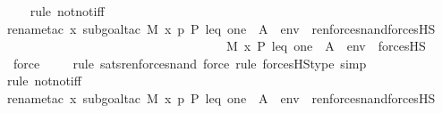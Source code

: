 \begin{isabellebody}
\ \ \ \isamarkupfalse%
{\isacharparenleft}{\kern0pt}rule\ notnot{\isacharunderscore}{\kern0pt}iff{\isacharparenright}{\kern0pt}\isanewline
\ \ \isamarkupfalse%
{\isacharparenleft}{\kern0pt}rename{\isacharunderscore}{\kern0pt}tac\ x{\isacharcomma}{\kern0pt}\ subgoal{\isacharunderscore}{\kern0pt}tac\ {\isachardoublequoteopen}M{\isacharcomma}{\kern0pt}\ {\isacharbrackleft}{\kern0pt}x{\isacharcomma}{\kern0pt}\ p{\isacharcomma}{\kern0pt}\ P{\isacharcomma}{\kern0pt}\ leq{\isacharcomma}{\kern0pt}\ one{\isacharbrackright}{\kern0pt}\ {\isacharat}{\kern0pt}\ {\isacharparenleft}{\kern0pt}{\isacharbrackleft}{\kern0pt}A{\isacharbrackright}{\kern0pt}\ {\isacharat}{\kern0pt}\ env{\isacharparenright}{\kern0pt}\ {\isasymTurnstile}\ ren{\isacharunderscore}{\kern0pt}forces{\isacharunderscore}{\kern0pt}nand{\isacharparenleft}{\kern0pt}forcesHS{\isacharprime}{\kern0pt}{\isacharparenleft}{\kern0pt}{\isasymphi}{\isacharparenright}{\kern0pt}{\isacharparenright}{\kern0pt}\ {\isasymlongleftrightarrow}\isanewline
\ \ \ \ \ \ \ \ \ \ \ \ \ \ \ \ \ \ \ \ \ \ \ \ \ \ \ \ \ \ \ \ \ \ \ M{\isacharcomma}{\kern0pt}\ {\isacharbrackleft}{\kern0pt}x{\isacharcomma}{\kern0pt}\ P{\isacharcomma}{\kern0pt}\ leq{\isacharcomma}{\kern0pt}\ one{\isacharbrackright}{\kern0pt}\ {\isacharat}{\kern0pt}\ {\isacharparenleft}{\kern0pt}{\isacharbrackleft}{\kern0pt}A{\isacharbrackright}{\kern0pt}\ {\isacharat}{\kern0pt}\ env{\isacharparenright}{\kern0pt}\ {\isasymTurnstile}\ forcesHS{\isacharprime}{\kern0pt}{\isacharparenleft}{\kern0pt}{\isasymphi}{\isacharparenright}{\kern0pt}{\isachardoublequoteclose}{\isacharparenright}{\kern0pt}\isanewline
\ \ \ \ \isamarkupfalse%
\ force\ \isanewline
\ \ \ \isamarkupfalse%
{\isacharparenleft}{\kern0pt}rule\ sats{\isacharunderscore}{\kern0pt}ren{\isacharunderscore}{\kern0pt}forces{\isacharunderscore}{\kern0pt}nand{\isacharcomma}{\kern0pt}\ force{\isacharcomma}{\kern0pt}\ rule\ forcesHS{\isacharprime}{\kern0pt}{\isacharunderscore}{\kern0pt}type{\isacharcomma}{\kern0pt}\ simp{\isacharparenright}{\kern0pt}\isanewline
\ \ \ \isamarkupfalse%
{\isacharparenleft}{\kern0pt}rule\ notnot{\isacharunderscore}{\kern0pt}iff{\isacharparenright}{\kern0pt}\isanewline
\ \ \isamarkupfalse%
{\isacharparenleft}{\kern0pt}rename{\isacharunderscore}{\kern0pt}tac\ x{\isacharcomma}{\kern0pt}\ subgoal{\isacharunderscore}{\kern0pt}tac\ {\isachardoublequoteopen}M{\isacharcomma}{\kern0pt}\ {\isacharbrackleft}{\kern0pt}x{\isacharcomma}{\kern0pt}\ p{\isacharcomma}{\kern0pt}\ P{\isacharcomma}{\kern0pt}\ leq{\isacharcomma}{\kern0pt}\ one{\isacharbrackright}{\kern0pt}\ {\isacharat}{\kern0pt}\ {\isacharparenleft}{\kern0pt}{\isacharbrackleft}{\kern0pt}A{\isacharbrackright}{\kern0pt}\ {\isacharat}{\kern0pt}\ env{\isacharparenright}{\kern0pt}\ {\isasymTurnstile}\ ren{\isacharunderscore}{\kern0pt}forces{\isacharunderscore}{\kern0pt}nand{\isacharparenleft}{\kern0pt}forcesHS{\isacharprime}{\kern0pt}{\isacharparenleft}{\kern0pt}{\isasympsi}{\isacharparenright}{\kern0pt}{\isacharparenright}{\kern0pt}\ {\isasymlongleftrightarrow}\isanewline

\end{isabellebody}

